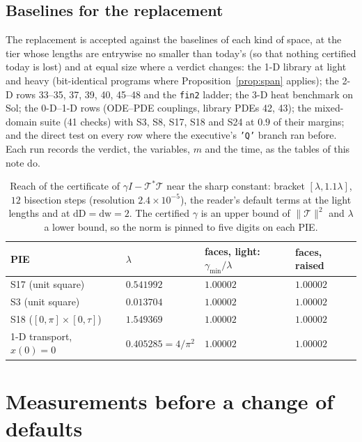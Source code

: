 \documentclass[12pt]{article}
\newcommand{\mcl}[1]{\mathcal{#1}}
\newcommand{\code}[1]{\texttt{#1}}
\theoremstyle{plain}
\theoremstyle{definition}
\theoremstyle{remark}
\begin{document}
\subsection{Baselines for the replacement}\label{sec:baselines}

The replacement is accepted against the baselines of each kind of space, at the tier whose lengths are entrywise no smaller than today's (so that nothing certified today is lost) and at equal size where a verdict changes: the 1-D library at light and heavy (bit-identical programs where Proposition~\ref{prop:span} applies); the 2-D rows 33--35, 37, 39, 40, 45--48 and the \code{fin2} ladder; the 3-D heat benchmark on Sol; the 0-D--1-D rows (ODE--PDE couplings, library PDEs 42, 43); the mixed-domain suite (41 checks) with S3, S8, S17, S18 and S24 at $0.9$ of their margins; and the direct test on every row where the executive's \code{'Q'} branch ran before. Each run records the verdict, the variables, $m$ and the time, as the tables of this note do.

\begin{table}[h]\centering\footnotesize
\setlength{\tabcolsep}{6pt}
\begin{tabular}{llll}
\toprule
PIE & $\lambda$ & faces, light: $\gamma_{\min}/\lambda$ & faces, raised \\
\midrule
S17 (unit square) & $0.541992$ & $1.00002$ & $1.00002$ \\
S3 (unit square) & $0.013704$ & $1.00002$ & $1.00002$ \\
S18 ($[0,\pi]\times[0,\tau]$) & $1.549369$ & $1.00002$ & $1.00002$ \\
1-D transport, $x(0)=0$ & $0.405285=4/\pi^2$ & $1.00002$ & $1.00002$ \\
\bottomrule
\end{tabular}
\caption{Reach of the certificate of $\gamma I-\mcl T^*\mcl T$ near the sharp constant: bracket $[\lambda,1.1\lambda]$, $12$ bisection steps (resolution $2.4\times10^{-5}$), the reader's default terms at the light lengths and at $\mathrm{dD}=\mathrm{dw}=2$. The certified $\gamma$ is an upper bound of $\|\mcl T\|^2$ and $\lambda$ a lower bound, so the norm is pinned to five digits on each PIE.}\label{tab:poinc2}
\end{table}

\section{Measurements before a change of defaults}\label{sec:measure}
\end{document}
